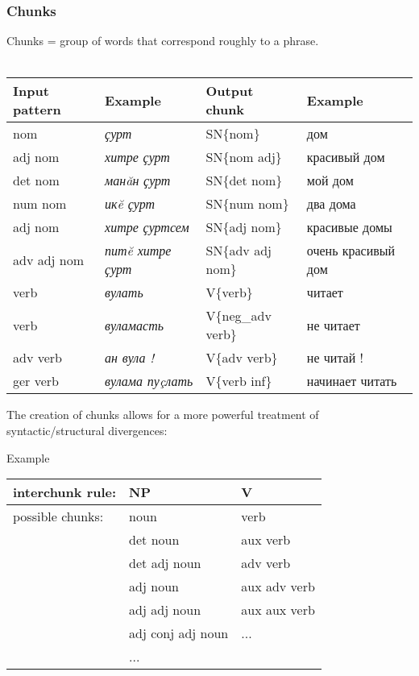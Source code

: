 \documentclass[10pt,xetex]{beamer} %
\begin{document}
\begin{frame}
  \frametitle{Chunks}

Chunks = group of words that correspond roughly to a phrase. \\
~\\

\begin{small}
\begin{tabular}{llll}
{\bf Input pattern} & 	{\bf Example} & 	{\bf Output chunk} &	{\bf Example} \\
\hline
nom & 	{\em ҫурт} &	SN$\{$nom$\}$ &	дом \\
adj nom & 	{\em хитре ҫурт} & 	SN$\{$nom adj$\}$ &	красивый дом \\
det nom &	{\em манăн ҫурт} &	SN$\{$det nom$\}$ &	мой дом\\
num nom &	{\em икĕ ҫурт} &	SN$\{$num nom$\}$ &	два дома\\
adj nom &	{\em хитре ҫуртсем} & 	SN$\{$adj nom$\}$ &	красивые домы\\
adv adj nom &	{\em питĕ хитре ҫурт} & 	SN$\{$adv adj nom$\}$ &	очень красивый дом\\
\hline
verb &	{\em вулать} 	& V$\{$verb$\}$  &	читает \\
verb &	{\em вуламасть} &	V$\{$neg\_{}adv verb$\}$  &	не читает  \\
adv verb &	{\em ан вула !} & 	V$\{$adv verb$\}$ &	не читай ! \\
ger verb &	{\em вулама пуçлать} & 	V$\{$verb inf$\}$ 	&начинает читать \\
\hline
\end{tabular}
\end{small}

\end{frame}

\begin{frame}
The creation of chunks allows for a more powerful treatment of syntactic/structural divergences:

\begin{exampleblock}{Example} %
\begin{tabular}{l|l|l}
interchunk rule: & NP & V\\
\hline
possible chunks: & noun & verb\\
& det noun & aux verb\\
& det adj noun & adv verb\\
& adj noun & aux adv verb \\
& adj adj noun & aux aux verb\\
& adj conj adj noun & ...\\
& ... &\\


\end{tabular}
\end{exampleblock}

\end{frame}
\end{document}
